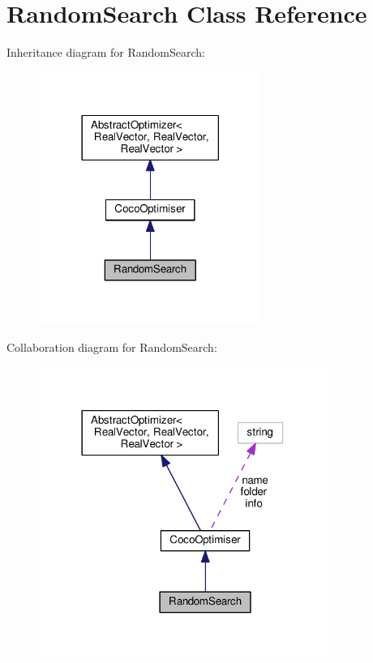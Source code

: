 \hypertarget{classRandomSearch}{}\section{Random\+Search Class Reference}
\label{classRandomSearch}


Inheritance diagram for Random\+Search\+:\nopagebreak
\begin{figure}[H]
\begin{center}
\leavevmode
\includegraphics[width=206pt]{classRandomSearch__inherit__graph}
\end{center}
\end{figure}


Collaboration diagram for Random\+Search\+:\nopagebreak
\begin{figure}[H]
\begin{center}
\leavevmode
\includegraphics[width=266pt]{classRandomSearch__coll__graph}
\end{center}
\end{figure}
